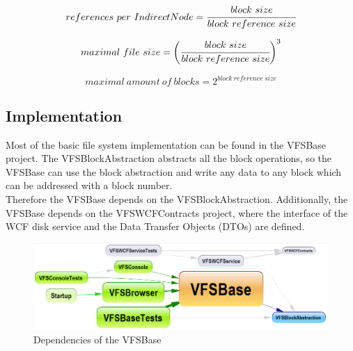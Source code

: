 \documentclass[JCDReport.tex]{subfiles}
\begin{document}
\begin{equation}
references\ per\ Indirect Node = \cfrac{block\ size}{block\ reference\ size}
\end{equation}

\begin{equation}
\begin{split}
maximal\ file\ size =
  \bigg(\cfrac{block\ size}{block\ reference\ size}\bigg)^3\\
\end{split}
\end{equation}

\begin{equation}
maximal\ amount\ of\ blocks = 2^{block\ reference\ size}
\end{equation}


\subsection{Implementation}

Most of the basic file system implementation can be found in the VFSBase project. The VFSBlockAbstraction abstracts all the block operations, so the VFSBase can use the block abstraction and write any data to any block which can be addressed with a block number.\\

Therefore the VFSBase depends on the VFSBlockAbstraction. Additionally, the VFSBase depends on the VFSWCFContracts project, where the interface of the WCF disk service and the Data Transfer Objects (DTOs) are defined.

\begin{figure}[h!]
	\centering
	\includegraphics[scale=0.45]{Images/vfsbase_dependency_diagram.png} 
	\caption{Dependencies of the VFSBase}
\end{figure}
\end{document}

